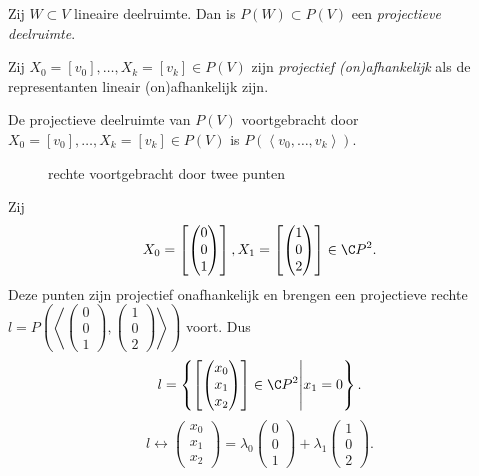\begin{definitie}
	Zij $W \subset V$ lineaire deelruimte. Dan is $P(W) \subset  P(V)$ een \emph{projectieve deelruimte}.
\end{definitie}
\begin{definitie}
	Zij $X_0 = [v_0], \ldots, X_k = [v_k] \in P(V) $ zijn \emph{projectief (on)afhankelijk} als de representanten lineair (on)afhankelijk zijn.
\end{definitie}
\begin{definitie}
	De projectieve deelruimte van $P(V)$ voortgebracht door $X_0 = [v_0], \ldots, X_k = [v_k] \in P(V) $ is $P(\left< v_0, \ldots, v_k \right>)$.
\end{definitie}
\begin{figure}[ht]
    \centering
    \caption{rechte voortgebracht door twee punten}
    \label{fig:rechte-voortgebracht}
\end{figure}
\begin{vb}
	Zij \[
	X_0 = \left[ \begin{pmatrix} 0 \\ 0 \\1 \end{pmatrix}  \right] , X_1 = \left[ \begin{pmatrix}  1 \\ 0 \\ 2\end{pmatrix}  \right] \in \C P^2
	.\] 
	Deze punten zijn projectief onafhankelijk en brengen een projectieve rechte $l = P\left(\left<\begin{pmatrix} 0 \\0 \\1 \end{pmatrix} , \begin{pmatrix} 1 \\ 0 \\2 \end{pmatrix}  \right>\right)$ voort. 
	Dus \[
	 l = \left\{ \left[ \begin{pmatrix} x_0 \\ x_1 \\ x_2\end{pmatrix}  \right] \in \C P^2 \middle | x_1 = 0  \right\}
	.\] 
	\[
	l \leftrightarrow \begin{pmatrix} x_0 \\ x_1 \\ x_2 \end{pmatrix} = \lambda_0 \begin{pmatrix} 0 \\0\\1 \end{pmatrix}  + \lambda_1 \begin{pmatrix}  1 \\ 0 \\ 2 \end{pmatrix}  
	.\] 
\end{vb}
